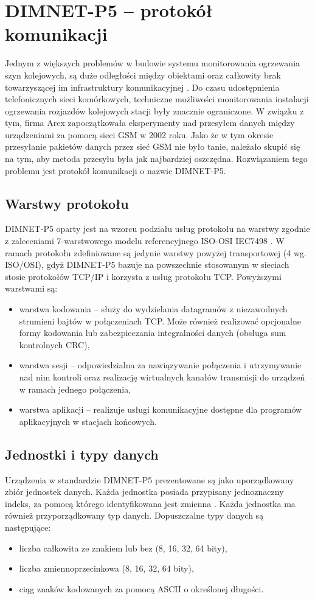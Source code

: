 \section{DIMNET-P5 -- protokół komunikacji}
Jednym z większych problemów w budowie systemu monitorowania ogrzewania szyn kolejowych, są duże odległości między obiektami oraz całkowity brak towarzyszącej im infrastruktury komunikacyjnej \cite{dimnetp5-spec}. Do czasu udostępnienia telefonicznych sieci komórkowych, techniczne możliwości monitorowania instalacji ogrzewania rozjazdów kolejowych stacji były znacznie ograniczone. W związku z tym, firma Arex zapoczątkowała eksperymenty nad przesyłem danych między urządzeniami za pomocą sieci GSM w 2002 roku. Jako że w tym okresie przesyłanie pakietów danych przez sieć GSM nie było tanie, należało skupić się na tym, aby metoda przesyłu była jak najbardziej oszczędna. Rozwiązaniem tego problemu jest protokół komunikacji o nazwie DIMNET-P5.

\subsection{Warstwy protokołu}
DIMNET-P5 oparty jest na wzorcu podziału usług protokołu na warstwy zgodnie z zaleceniami 7-warstwowego modelu referencyjnego ISO-OSI IEC7498 \cite{dimnetp5-spec}. W ramach protokołu zdefiniowane są jedynie warstwy powyżej transportowej (4 wg. ISO/OSI), gdyż DIMNET-P5 bazuje na powszechnie stosowanym w sieciach stosie protokołów TCP/IP i korzysta z usług protokołu TCP. Powyższymi warstwami są:
\begin{itemize}
\item warstwa kodowania -- służy do wydzielania datagramów z niezawodnych strumieni bajtów w połączeniach TCP. Może również realizować opcjonalne formy kodowania lub zabezpieczania integralności danych (obsługa sum kontrolnych CRC),
\item warstwa sesji -- odpowiedzialna za nawiązywanie połączenia i utrzymywanie nad nim kontroli oraz realizację wirtualnych kanałów transmisji do urządzeń w ramach jednego połączenia,
\item warstwa aplikacji -- realizuje usługi komunikacyjne dostępne dla programów aplikacyjnych w stacjach końcowych.
\end{itemize}

\subsection{Jednostki i typy danych}
Urządzenia w standardzie DIMNET-P5 prezentowane są jako uporządkowany zbiór jednostek danych. Każda jednostka posiada przypisany jednoznaczny indeks, za pomocą którego identyfikowana jest zmienna \cite{dimnetp5-spec}. Każda jednostka ma również przyporządkowany typ danych. Dopuszczalne typy danych są następujące:
\begin{itemize}
\item liczba całkowita ze znakiem lub bez (8, 16, 32, 64 bity),
\item liczba zmiennoprzecinkowa (8, 16, 32, 64 bity),
\item ciąg znaków kodowanych za pomocą ASCII o określonej długości.
\end{itemize}


